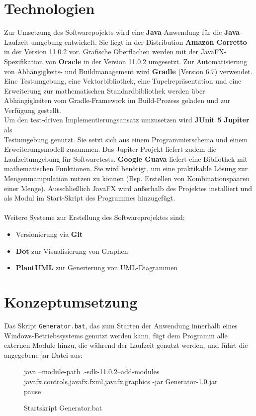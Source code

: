 \section{Technologien}
Zur Umsetzung des Softwarepojekts wird eine \textbf{Java}-Anwendung für die \textbf{Java}-Laufzeit-umgebung entwickelt.
Sie liegt in der Distribution \textbf{Amazon Corretto} in der Version 11.0.2 vor.
Grafische Oberflächen werden mit der JavaFX-Spezifikation von \textbf{Oracle} in der Version 11.0.2 umgesetzt.
Zur Automatisierung von Abhängigkeits- und Buildmanagement wird \textbf{Gradle} (Version 6.7) verwendet.
Eine Testumgebung, eine Vektorbibliothek, eine Tupelrepräsentation und eine Erweiterung zur mathematischen
Standardbibliothek werden über Abhängigkeiten vom Gradle-Framework im Build-Prozess geladen und zur Verfügung
gestellt.\\
Um den test-driven Implementierungsansatz umzusetzen wird \textbf{JUnit 5 Jupiter} als\\ Testumgebung genutzt.
Sie setzt sich aus einem Programmierschema und einem Erweiterungsmodell zusammen.
Das Jupiter-Projekt liefert zudem die Laufzeitumgebung für Softwaretests.
\textbf{Google Guava} liefert eine Bibliothek mit mathematischen Funktionen.
Sie wird benötigt, um eine praktikable Lösung zur Mengenmanipulation nutzen zu können (Bsp. Erstellen
von Kombinationspaaren einer Menge).
Ausschließlich JavaFX wird außerhalb des Projektes installiert und als Modul im Start-Skript des Programmes
hinzugefügt.
\\~\\
Weitere Systeme zur Erstellung des Softwareprojektes sind:
\begin{itemize}
    \item Versionierung via \textbf{Git}
    \item \textbf{Dot} zur Visualisierung von Graphen
    \item \textbf{PlantUML} zur Generierung von UML-Diagrammen
\end{itemize}

\newpage

\section{Konzeptumsetzung}

Das Skript \texttt{Generator.bat}, das zum Starten der Anwendung innerhalb eines Windows-Betriebssystems genutzt werden kann,
fügt dem Programm alle externen Module hinzu, die während der Laufzeit genutzt werden, und führt die angegebene jar-Datei aus:
\begin{figure}[H]
    \centering
    \begin{csource}
    java --module-path .\javafx-sdk-11.0.2\lib --add-modules javafx.controls,javafx.fxml,javafx.graphics -jar Generator-1.0.jar
    pause
    \end{csource}
    \caption{Startskript Generator.bat}
\end{figure}

